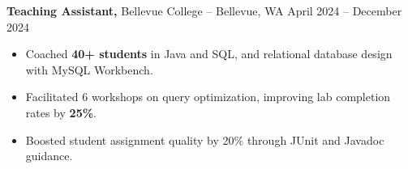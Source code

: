 \documentclass[11pt]{article}       %
\begin{document}

\textbf{Teaching Assistant,} {Bellevue College} -- Bellevue, WA \hfill April 2024 -- December 2024 \\
\vspace{-9pt}
\begin{itemize}
  \item Coached \textbf{40+ students} in Java and SQL, and relational database design with MySQL Workbench.
  \item Facilitated 6 workshops on query optimization, improving lab completion rates by \textbf{25\%}.
  \item Boosted student assignment quality by 20\% through JUnit and Javadoc guidance.
\end{itemize}

\end{document}
